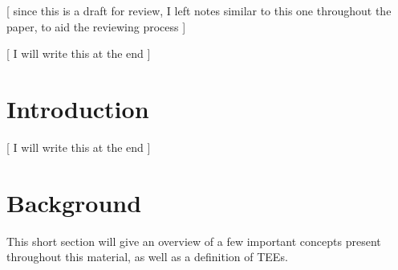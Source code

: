 \documentclass[runningheads,a4paper]{uwsese}
\begin{document}
\mainmatter 

\title{}%
\subtitle{Seminar Software Engineering}

\titlerunning{} %

\date{Winter Semester 2023}


\author{} %
%
\authorrunning{} %


\maketitle

\begin{abstract}



\end{abstract}

[ since this is a draft for review, I left notes similar to this one throughout the paper, to aid the reviewing process ]

[ I will write this at the end ]

\section{Introduction}

[ I will write this at the end ]

\section{Background}

This short section will give an overview of a few important concepts present
throughout this material, as well as a definition of TEEs. 
\end{document}
